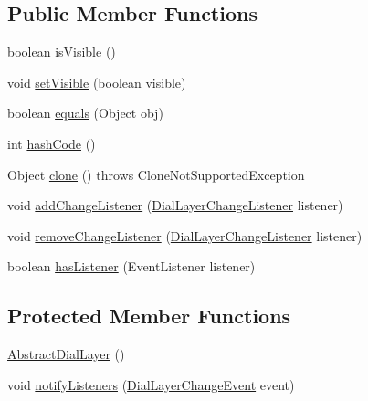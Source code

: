 \subsection*{Public Member Functions}
\begin{DoxyCompactItemize}
\item 
boolean \mbox{\hyperlink{classorg_1_1jfree_1_1chart_1_1plot_1_1dial_1_1_abstract_dial_layer_a0e4e9aff1a280718d2018d9e94c28027}{is\+Visible}} ()
\item 
void \mbox{\hyperlink{classorg_1_1jfree_1_1chart_1_1plot_1_1dial_1_1_abstract_dial_layer_adb2e0eb36094ed7735624cc8e0060710}{set\+Visible}} (boolean visible)
\item 
boolean \mbox{\hyperlink{classorg_1_1jfree_1_1chart_1_1plot_1_1dial_1_1_abstract_dial_layer_a55a91479217a8b3e2a51ab6ba60068ef}{equals}} (Object obj)
\item 
int \mbox{\hyperlink{classorg_1_1jfree_1_1chart_1_1plot_1_1dial_1_1_abstract_dial_layer_aee533fc0d3c54f6813522f62cbd47ce1}{hash\+Code}} ()
\item 
Object \mbox{\hyperlink{classorg_1_1jfree_1_1chart_1_1plot_1_1dial_1_1_abstract_dial_layer_a29be7ba6877313aea93b9d62745cebe6}{clone}} ()  throws Clone\+Not\+Supported\+Exception 
\item 
void \mbox{\hyperlink{classorg_1_1jfree_1_1chart_1_1plot_1_1dial_1_1_abstract_dial_layer_ac0d049259317ed60eff0d0c38ecd1f34}{add\+Change\+Listener}} (\mbox{\hyperlink{interfaceorg_1_1jfree_1_1chart_1_1plot_1_1dial_1_1_dial_layer_change_listener}{Dial\+Layer\+Change\+Listener}} listener)
\item 
void \mbox{\hyperlink{classorg_1_1jfree_1_1chart_1_1plot_1_1dial_1_1_abstract_dial_layer_a584dfebd9266b2be68b75916812a3b8f}{remove\+Change\+Listener}} (\mbox{\hyperlink{interfaceorg_1_1jfree_1_1chart_1_1plot_1_1dial_1_1_dial_layer_change_listener}{Dial\+Layer\+Change\+Listener}} listener)
\item 
boolean \mbox{\hyperlink{classorg_1_1jfree_1_1chart_1_1plot_1_1dial_1_1_abstract_dial_layer_ae5ce22720d24ab3fb6cf93ddf2714a82}{has\+Listener}} (Event\+Listener listener)
\end{DoxyCompactItemize}
\subsection*{Protected Member Functions}
\begin{DoxyCompactItemize}
\item 
\mbox{\hyperlink{classorg_1_1jfree_1_1chart_1_1plot_1_1dial_1_1_abstract_dial_layer_acd96ec6eb525e4b03d6ab53af0ac2aa8}{Abstract\+Dial\+Layer}} ()
\item 
void \mbox{\hyperlink{classorg_1_1jfree_1_1chart_1_1plot_1_1dial_1_1_abstract_dial_layer_adc738beac6025c974b0088a54718cecc}{notify\+Listeners}} (\mbox{\hyperlink{classorg_1_1jfree_1_1chart_1_1plot_1_1dial_1_1_dial_layer_change_event}{Dial\+Layer\+Change\+Event}} event)
\end{DoxyCompactItemize}


